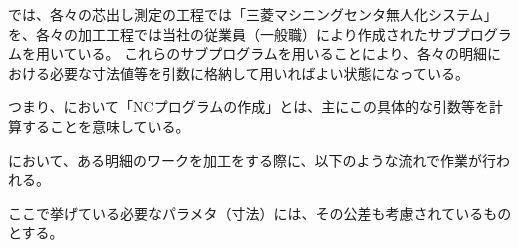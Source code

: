 \noindent
\MMC では、各々の芯出し測定の工程では「三菱マシニングセンタ無人化システム」を、各々の加工工程では当社の従業員（一般職）により作成されたサブプログラムを用いている。
これらのサブプログラムを用いることにより、各々の明細における必要な寸法値等を引数に格納して用いればよい状態になっている。
\begin{marker}
つまり、\MMC において「NCプログラムの作成」とは、主にこの具体的な引数等を計算することを意味している。
\end{marker}



\clearpage
\MMC において、ある明細のワークを加工をする際に、以下のような流れで作業が行われる。
\begin{marker}
ここで挙げている必要なパラメタ（寸法）には、その公差も考慮されているものとする。
\end{marker}


